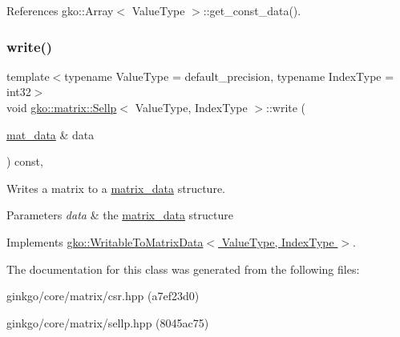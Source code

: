 References gko\+::\+Array$<$ Value\+Type $>$\+::get\+\_\+const\+\_\+data().

\mbox{\label{classgko_1_1matrix_1_1Sellp_aae2355a2866318b154d017b1c51f30a5}} 
\subsubsection{\texorpdfstring{write()}{write()}}
{\footnotesize\ttfamily template$<$typename Value\+Type = default\+\_\+precision, typename Index\+Type = int32$>$ \\
void \hyperlink{classgko_1_1matrix_1_1Sellp}{gko\+::matrix\+::\+Sellp}$<$ Value\+Type, Index\+Type $>$\+::write (\begin{DoxyParamCaption}\item[{\hyperlink{structgko_1_1matrix__data}{mat\+\_\+data} \&}]{data }\end{DoxyParamCaption}) const\hspace{0.3cm}{\ttfamily [override]}, {\ttfamily [virtual]}}



Writes a matrix to a \hyperlink{structgko_1_1matrix__data}{matrix\+\_\+data} structure. 


\begin{DoxyParams}{Parameters}
{\em data} & the \hyperlink{structgko_1_1matrix__data}{matrix\+\_\+data} structure \\
\hline
\end{DoxyParams}


Implements \hyperlink{classgko_1_1WritableToMatrixData_a96036c3a4bf4c67fa93002808b8b14e2}{gko\+::\+Writable\+To\+Matrix\+Data$<$ Value\+Type, Index\+Type $>$}.



The documentation for this class was generated from the following files\+:\begin{DoxyCompactItemize}
\item 
ginkgo/core/matrix/csr.\+hpp (a7ef23d0)\item 
ginkgo/core/matrix/sellp.\+hpp (8045ac75)\end{DoxyCompactItemize}
